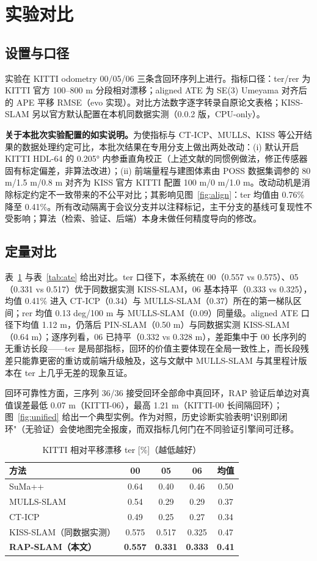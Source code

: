 \documentclass[UTF8,12pt]{ctexart}
\begin{document}
\section{实验对比}
\subsection{设置与口径}
实验在 KITTI odometry 00/05/06 三条含回环序列上进行。指标口径：ter/rer 为 KITTI 官方 100--800 m 分段相对漂移；aligned ATE 为 SE(3) Umeyama 对齐后的 APE 平移 RMSE（evo 实现）。对比方法数字逐字转录自原论文表格；KISS-SLAM 另以官方默认配置在本机同数据实测（0.0.2 版，CPU-only）。

\textbf{关于本批次实验配置的如实说明。}为使指标与 CT-ICP、MULLS、KISS 等公开结果的数据处理约定可比，本批次结果在专用分支上做出两处改动：(i) 默认开启 KITTI HDL-64 的 0.205° 内参垂直角校正（上述文献的同惯例做法，修正传感器固有标定偏差，非算法改进）；(ii) 前端量程与建图体素由 POSS 数据集调参的 80 m/1.5 m/0.8 m 对齐为 KISS 官方 KITTI 配置 100 m/0 m/1.0 m。改动动机是消除标定约定不一致带来的不公平对比；其影响见图~\ref{fig:align}：ter 均值由 0.76\% 降至 0.41\%。所有改动隔离于会议分支并以注释标记，主干分支的基线可复现性不受影响；算法（检索、验证、后端）本身未做任何精度导向的修改。

\subsection{定量对比}
表~\ref{tab:ter} 与表~\ref{tab:ate} 给出对比。ter 口径下，本系统在 00（0.557 vs 0.575）、05（0.331 vs 0.517）优于同数据实测 KISS-SLAM，06 基本持平（0.333 vs 0.325），均值 0.41\% 进入 CT-ICP（0.34）与 MULLS-SLAM（0.37）所在的第一梯队区间；rer 均值 0.13 deg/100 m 与 MULLS-SLAM（0.09）同量级。aligned ATE 口径下均值 1.12 m，仍落后 PIN-SLAM（0.50 m）与同数据实测 KISS-SLAM（0.64 m）；逐序列看，06 已持平（0.332 vs 0.328 m），差距集中于 00 长序列的无重访长段——ter 是局部指标，回环的价值主要体现在全局一致性上，而长段残差只能靠更密的重访或前端升级触及，这与文献中 MULLS-SLAM 与其里程计版本在 ter 上几乎无差的现象互证。

回环可靠性方面，三序列 36/36 接受回环全部命中真回环，RAP 验证后单边对真值误差最低 0.07 m（KITTI-06），最高 1.21 m（KITTI-00 长间隔回环）；图~\ref{fig:unified} 给出一个典型实例。作为对照，历史诊断实验表明"识别即闭环"（无验证）会使地图完全报废，而双指标几何门在不同验证引擎间可迁移。

\begin{table}[htbp]
\centering
\caption{KITTI 相对平移漂移 ter [\%]（越低越好）}
\label{tab:ter}
\begin{tabular}{lcccc}
\toprule
方法 & 00 & 05 & 06 & 均值 \\
\midrule
SuMa++ & 0.64 & 0.40 & 0.46 & 0.50 \\
MULLS-SLAM & 0.54 & 0.29 & 0.29 & 0.37 \\
CT-ICP & 0.49 & 0.25 & 0.27 & 0.34 \\
KISS-SLAM（同数据实测） & 0.575 & 0.517 & 0.325 & 0.47 \\
\textbf{RAP-SLAM（本文）} & \textbf{0.557} & \textbf{0.331} & \textbf{0.333} & \textbf{0.41} \\
\bottomrule
\end{tabular}
\end{table}
\end{document}
